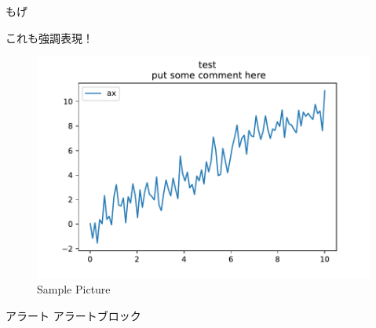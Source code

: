\documentclass[dvipdfmx, final, t]{beamer}
\begin{document}
\begin{frame}
\begin{columns}[t]
    \begin{column}{.45\linewidth}
      \begin{block}{もげ}

        \alert{これも強調表現！}

        \begin{figure}[h]   %
          \centering              %
          \includegraphics[width=180truemm,clip]{images/graph_sample.pdf}
          \caption{Sample Picture}%
          \label{fig:sample}      %
      \end{figure}
      \end{block}

      \begin{alertblock}{アラート}
        アラートブロック
      \end{alertblock}
    \end{column}
  \end{columns}
\end{frame}
\end{document}
